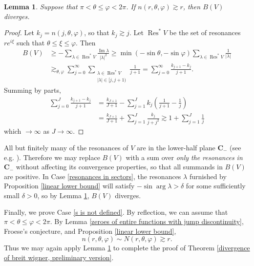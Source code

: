 \documentclass[reqno,12pt,letterpaper]{amsart}
\newcommand{\CC}{\mathbf{C}}
\DeclareMathOperator{\Res}{Res}
\renewcommand{\Im}{\operatorname{Im}}
\newtheorem{lemma}[theorem]{Lemma}
\theoremstyle{definition}
\begin{document}
\begin{lemma}
\label{divergence of angular series}
Suppose that $\pi < \theta \leq \varphi < 2\pi$. If $n(r, \theta, \varphi) \gtrsim r$, then $B(V)$ diverges.
\end{lemma}
\begin{proof}
Let $k_j = n(j, \theta, \varphi)$, so that $k_j \gtrsim j$.
Let $\Res^* V$ be the set of resonances $re^{i\xi}$ such that $\theta \leq \xi \leq \varphi$. Then
\begin{align*}
B(V) &\geq -\sum_{\lambda \in \Res^* V} \frac{\Im \lambda}{|\lambda|^2}  \geq \min(-\sin \theta, -\sin \varphi) \sum_{\lambda \in \Res^* V} \frac{1}{|\lambda|}\\%
  & \gtrsim_{\theta,\varphi} \sum_{j=0}^\infty \sum_{\substack{\lambda \in \Res^* V\\|\lambda| \in [j, j+1)}} \frac{1}{j+1}
  = \sum_{j=0}^\infty \frac{k_{j+1} - k_j}{j+1}.
\end{align*}
Summing by parts,
\begin{align*}
\sum_{j=0}^J \frac{k_{j+1} - k_j}{j+1} &= \frac{k_{J+1}}{J+1} - \sum_{j=1}^J k_j\left(\frac{1}{j+1} - \frac{1}{j}\right)\\
&=\frac{k_{J+1}}{J+1} + \sum_{j=1}^J \frac{k_j}{j + j^2} \gtrsim 1 + \sum_{j=1}^J \frac{1}{j}
\end{align*}
which $\to \infty$ as $J \to \infty$.
\end{proof}

All but finitely many of the resonances of $V$ are in the lower-half plane $\CC_-$ (see e.g. \cite[\S3]{froese1997asymptotic}). Therefore we may replace $B(V)$ with a sum over \emph{only the resonances in $\CC_-$} without affecting its convergence properties, so that all summands in $B(V)$ are positive. In Case \ref{resonances in sectors},
the resonances $\lambda$ furnished by Proposition \ref{linear lower bound} will satisfy $-\sin \arg \lambda > \delta$ for some sufficiently small $\delta > 0$,
so by Lemma \ref{divergence of angular series}, $B(V)$ diverges.

Finally, we prove Case \ref{s is not defined}. By reflection, we can assume that $\pi < \theta \leq \varphi < 2\pi$.
By Lemma \ref{zeroes of entire functions with jump discontinuity}, Froese's conjecture, and Proposition \ref{linear lower bound},
$$n(r, \theta, \varphi) \sim N(r, \theta, \varphi) \gtrsim r.$$
Thus we may again apply Lemma \ref{divergence of angular series} to complete the proof of Theorem \ref{divergence of breit wigner, preliminary version}.

\printbibliography
\end{document}

